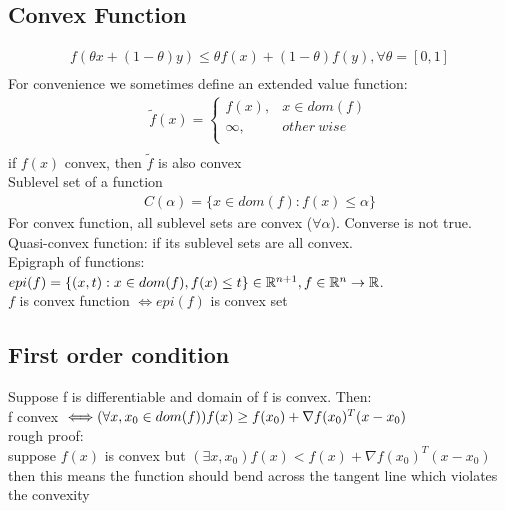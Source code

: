 \documentclass[8pt]{report}
\newcommand{\R}{\mathbb{R}}
\begin{document}
\begin{multicols*}{2}
  \subsection{Convex Function}
  \begin{align*}
    f(\theta x +(1-\theta) y) \leq \theta f(x) + (1-\theta) f(y), \forall \theta = [0,1]\\
  \end{align*}
  For convenience we sometimes define an extended value function:\\
  \begin{align*}
    \tilde{f}(x) = \begin{cases}
      f(x), & x \in dom(f)\\
      \infty, & other\ wise\\
    \end{cases}\\
  \end{align*}
  if $f(x)$ convex, then $\tilde{f}$ is also convex\\

  Sublevel set of a function
  \begin{align*}
    C(\alpha) = \{ x \in dom(f): f(x) \leq \alpha \}
  \end{align*}
  For convex function, all sublevel sets are convex ($\forall \alpha$). Converse is not true.\\
  
  Quasi-convex function: if its sublevel sets are all convex.\\
  
  Epigraph of functions:\\
  $epi(f)=\{(x,t): x \in dom(f), f(x) \leq t\} \in \R^{n+1}, \\f \in \R^n \to \R$.\\
  
 $f$ is convex function $\iff epi(f)$ is convex set\\

 \subsection{First order condition}
 Suppose f is differentiable and domain of f is convex. Then:\\
 f convex $\iff \\ (\forall x,x_0 \in dom(f)) f(x) \geq f(x_0) + \nabla f(x_0)^T(x-x_0)$\\

  rough proof:\\
  suppose $f(x)$ is convex but $(\exists x, x_0) f(x) < f(x) + \nabla f(x_0)^T(x-x_0)$\\
  then this means the function should bend across the tangent line which violates the convexity\\
  

\end{multicols*}
\end{document}
